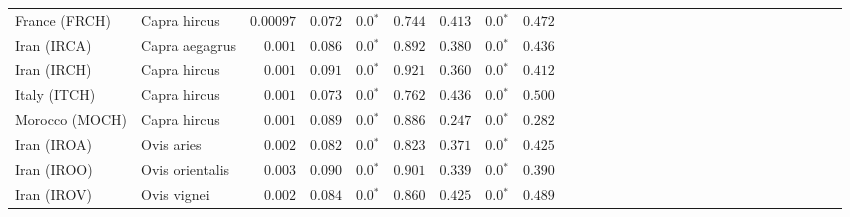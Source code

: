 \begin{center}
\begin{adjustbox}{width = 1\textwidth}
\begin{tabular}{|l|l|r|r|r|r|r|r|r|r|r|r|r|r|r|r|r|r|r|r|r|r|r|r|r|r|r|r|r|}
                  France (FRCH) &         Capra hircus &          $0.00097$ &                      $ 0.072$ &                  $\bm{0.0{^*}}$ &                                           $ 0.744$ &                      $ 0.413$ &                  $\bm{0.0{^*}}$ &                                           $ 0.472$ \\
                    Iran (IRCA) &       Capra aegagrus &           $ 0.001$ &                      $ 0.086$ &                  $\bm{0.0{^*}}$ &                                           $ 0.892$ &                      $ 0.380$ &                  $\bm{0.0{^*}}$ &                                           $ 0.436$ \\
                    Iran (IRCH) &         Capra hircus &           $ 0.001$ &                      $ 0.091$ &                  $\bm{0.0{^*}}$ &                                           $ 0.921$ &                      $ 0.360$ &                  $\bm{0.0{^*}}$ &                                           $ 0.412$ \\
                   Italy (ITCH) &         Capra hircus &           $ 0.001$ &                      $ 0.073$ &                  $\bm{0.0{^*}}$ &                                           $ 0.762$ &                      $ 0.436$ &                  $\bm{0.0{^*}}$ &                                           $ 0.500$ \\
                 Morocco (MOCH) &         Capra hircus &           $ 0.001$ &                      $ 0.089$ &                  $\bm{0.0{^*}}$ &                                           $ 0.886$ &                      $ 0.247$ &                  $\bm{0.0{^*}}$ &                                           $ 0.282$ \\
                    Iran (IROA) &           Ovis aries &           $ 0.002$ &                      $ 0.082$ &                  $\bm{0.0{^*}}$ &                                           $ 0.823$ &                      $ 0.371$ &                  $\bm{0.0{^*}}$ &                                           $ 0.425$ \\
                    Iran (IROO) &      Ovis orientalis &           $ 0.003$ &                      $ 0.090$ &                  $\bm{0.0{^*}}$ &                                           $ 0.901$ &                      $ 0.339$ &                  $\bm{0.0{^*}}$ &                                           $ 0.390$ \\
                    Iran (IROV) &          Ovis vignei &           $ 0.002$ &                      $ 0.084$ &                  $\bm{0.0{^*}}$ &                                           $ 0.860$ &                      $ 0.425$ &                  $\bm{0.0{^*}}$ &                                           $ 0.489$ \\

\end{tabular}
\end{adjustbox}
\end{center}
